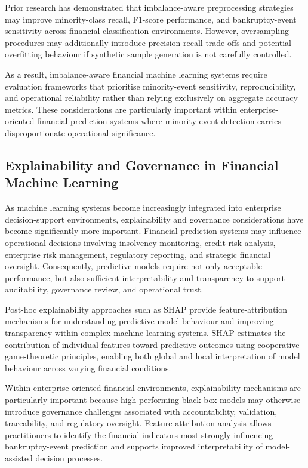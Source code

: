 \documentclass{article}
\begin{document}
Prior research has demonstrated that imbalance-aware preprocessing strategies may improve minority-class recall, F1-score performance, and bankruptcy-event sensitivity across financial classification environments. However, oversampling procedures may additionally introduce precision-recall trade-offs and potential overfitting behaviour if synthetic sample generation is not carefully controlled.

As a result, imbalance-aware financial machine learning systems require evaluation frameworks that prioritise minority-event sensitivity, reproducibility, and operational reliability rather than relying exclusively on aggregate accuracy metrics. These considerations are particularly important within enterprise-oriented financial prediction systems where minority-event detection carries disproportionate operational significance.

\subsection{Explainability and Governance in Financial Machine Learning}

As machine learning systems become increasingly integrated into enterprise decision-support environments, explainability and governance considerations have become significantly more important. Financial prediction systems may influence operational decisions involving insolvency monitoring, credit risk analysis, enterprise risk management, regulatory reporting, and strategic financial oversight. Consequently, predictive models require not only acceptable performance, but also sufficient interpretability and transparency to support auditability, governance review, and operational trust.

Post-hoc explainability approaches such as SHAP \cite{lundberg2017unified} provide feature-attribution mechanisms for understanding predictive model behaviour and improving transparency within complex machine learning systems. SHAP estimates the contribution of individual features toward predictive outcomes using cooperative game-theoretic principles, enabling both global and local interpretation of model behaviour across varying financial conditions.

Within enterprise-oriented financial environments, explainability mechanisms are particularly important because high-performing black-box models may otherwise introduce governance challenges associated with accountability, validation, traceability, and regulatory oversight. Feature-attribution analysis allows practitioners to identify the financial indicators most strongly influencing bankruptcy-event prediction and supports improved interpretability of model-assisted decision processes.
\end{document}

